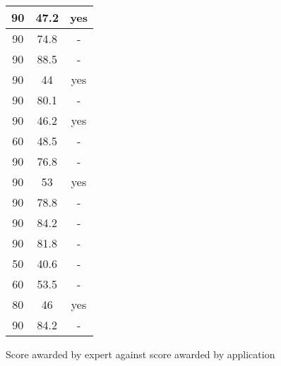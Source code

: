 \begin{figure}[H]
\begin{tabular}{ | c | c | c | }
		90 & 47.2 & yes \\ \hline
		90 & 74.8 & - \\ \hline
		90 & 88.5 & - \\ \hline
		90 & 44 & yes \\ \hline
		90 & 80.1 & - \\ \hline
		90 & 46.2 & yes \\ \hline
		60 & 48.5 & - \\ \hline
		90 & 76.8 & - \\ \hline
		90 & 53 & yes \\ \hline
		90 & 78.8 & - \\ \hline
		90 & 84.2 & - \\ \hline
		90 & 81.8 & - \\ \hline
		50 & 40.6 & - \\ \hline
		60 & 53.5 & - \\ \hline
		80 & 46 & yes \\ \hline
		90 & 84.2 & - \\ \hline
    \end{tabular}
\caption{Score awarded by expert against score awarded by application}
\label{fig:analysisevalscores}
\end{figure}

